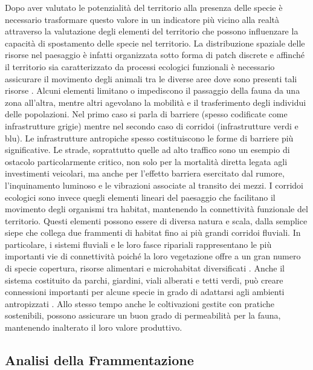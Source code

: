 \documentclass[
]{book}
\begin{document}
Dopo aver valutato le potenzialità del territorio alla presenza delle specie è necessario trasformare questo valore in un indicatore più vicino alla realtà attraverso la valutazione degli elementi del territorio che possono influenzare la capacità di spostamento delle specie nel territorio.
La distribuzione spaziale delle risorse nel paesaggio è infatti organizzata sotto forma di patch discrete e affinché il territorio sia caratterizzato da processi ecologici funzionali è necessario assicurare il movimento degli animali tra le diverse aree dove sono presenti tali risorse \citep{taylorConnectivityVitalElement1993}.
Alcuni elementi limitano o impediscono il passaggio della fauna da una zona all'altra, mentre altri agevolano la mobilità e il trasferimento degli individui delle popolazioni.
Nel primo caso si parla di barriere (spesso codificate come infrastrutture grigie) mentre nel secondo caso di corridoi (infrastrutture verdi e blu).
Le infrastrutture antropiche spesso costituiscono le forme di barriere più significative.
Le strade, soprattutto quelle ad alto traffico sono un esempio di ostacolo particolarmente critico, non solo per la mortalità diretta legata agli investimenti veicolari, ma anche per l'effetto barriera esercitato dal rumore, l'inquinamento luminoso e le vibrazioni associate al transito dei mezzi.
I corridoi ecologici sono invece quegli elementi lineari del paesaggio che facilitano il movimento degli organismi tra habitat, mantenendo la connettività funzionale del territorio.
Questi elementi possono essere di diversa natura e scala, dalla semplice siepe che collega due frammenti di habitat fino ai più grandi corridoi fluviali.
In particolare, i sistemi fluviali e le loro fasce ripariali rappresentano le più importanti vie di connettività poiché la loro vegetazione offre a un gran numero di specie copertura, risorse alimentari e microhabitat diversificati \citep{taylorConnectivityVitalElement1993}.
Anche il sistema costituito da parchi, giardini, viali alberati e tetti verdi, può creare connessioni importanti per alcune specie in grado di adattarsi agli ambienti antropizzati \citep{simaika2016, proske2022, nie2021, gann2019}.
Allo stesso tempo anche le coltivazioni gestite con pratiche sostenibili, possono assicurare un buon grado di permeabilità per la fauna, mantenendo inalterato il loro valore produttivo.

\subsection{Analisi della Frammentazione}\label{analisi-della-frammentazione}
\end{document}
